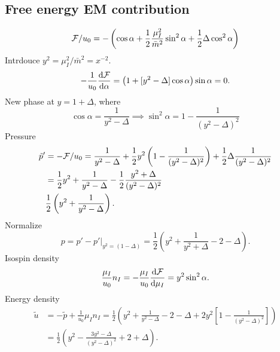 \documentclass{book}
\begin{document}
\subsection{Free energy EM contribution}

\begin{equation}
    \mathcal{F} / u_0 = -
    \left( 
        \cos \alpha 
        + \frac{1}{2} \frac{\mu_I^2}{\bar m^2} \sin^2 \alpha 
        + \frac{1}{2} \Delta  \cos^2 \alpha 
    \right)
\end{equation}
Intrdouce $y^2 = \mu_I^2 / \bar m^2 = x^{-2}$. 
\begin{equation}
    -\frac{1}{u_0}\odv{\Eff}{\alpha} = 
    \left(  
        1 + [y^2 - \Delta ]\cos \alpha 
    \right) \sin \alpha = 0.
\end{equation}
New phase at $y = 1 + \Delta$, where
\begin{equation}
    \cos \alpha = \frac{1}{y^2 - \Delta} 
    \implies \sin^2 \alpha = 1 - \frac{1}{(y^2 - \Delta)^2}
\end{equation}
Pressure
\begin{align}
    \tilde p' 
    &= -\mathcal{F}/u_0 = \frac{1}{y^2 - \Delta} 
    + \frac{1}{2} y^2 \left( 1 - \frac{1}{(y^2 - \Delta)^2} \right)
    + \frac{1}{2} \Delta \frac{1}{(y^2 - \Delta)^2} \\
    & = \frac{1}{2} y^2 + \frac{1}{y^2 - \Delta}
    - \frac{1}{2} \frac{y^2 + \Delta}{(y^2 - \Delta)^2} \\
    & \frac{1}{2} \left(y^2 + \frac{1}{y^2 - \Delta}\right).
\end{align}
Normalize
\begin{equation}
    p = p' - p'|_{y^2 = (1 - \Delta)}
    = \frac{1}{2} \left( y^2 + \frac{1}{y^2 + \Delta} - 2 - \Delta \right).
\end{equation}
Isospin density
\begin{equation}
    \frac{\mu_I}{u_0} n_I = - \frac{\mu_I}{u_0} \odv{\Eff}{\mu_I}
    = y^2 \sin^2 \alpha.
\end{equation}
Energy density
\begin{align}
    \tilde u &= -\tilde p + \frac{1}{u_0} \mu_I n_I
    = \frac{1}{2} 
    \left(
        y^2 + \frac{1}{y^2 - \Delta} - 2 - \Delta + 2y^2 
        \left[1 -\frac{1}{(y^2 - \Delta)^2}\right]
    \right) \\
    & =
    \frac{1}{2}
    \left(
        y^2
        - \frac{3 y^2  - \Delta}{(y^2 - \Delta)^2}
        + 2 + \Delta 
    \right).
\end{align}
\end{document}
